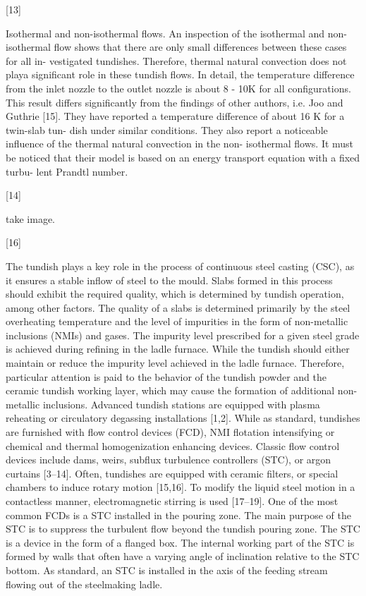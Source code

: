 [13]

Isothermal and non-isothermal flows. An inspection of
the isothermal and non-isothermal flow shows that there
are only small differences between these cases for all in-
vestigated tundishes. Therefore, thermal natural convection
does not playa significant role in these tundish flows. In
detail, the temperature difference from the inlet nozzle to
the outlet nozzle is about 8 - 10K for all configurations.
This result differs significantly from the findings of other
authors, i.e. Joo and Guthrie [15]. They have reported a
temperature difference of about 16 K for a twin-slab tun-
dish under similar conditions. They also report a noticeable
influence of the thermal natural convection in the non-
isothermal flows. It must be noticed that their model is
based on an energy transport equation with a fixed turbu-
lent Prandtl number.

[14]

take image.

[16]

The tundish plays a key role in the process of continuous steel casting (CSC), as it ensures a stable
inflow of steel to the mould. Slabs formed in this process should exhibit the required quality, which is
determined by tundish operation, among other factors. The quality of a slabs is determined primarily
by the steel overheating temperature and the level of impurities in the form of non-metallic inclusions
(NMIs) and gases. The impurity level prescribed for a given steel grade is achieved during refining in the
ladle furnace. While the tundish should either maintain or reduce the impurity level achieved in the ladle
furnace. Therefore, particular attention is paid to the behavior of the tundish powder and the ceramic
tundish working layer, which may cause the formation of additional non-metallic inclusions. Advanced
tundish stations are equipped with plasma reheating or circulatory degassing installations [1,2]. While
as standard, tundishes are furnished with flow control devices (FCD), NMI flotation intensifying or
chemical and thermal homogenization enhancing devices. Classic flow control devices include dams,
weirs, subflux turbulence controllers (STC), or argon curtains [3–14]. Often, tundishes are equipped
with ceramic filters, or special chambers to induce rotary motion [15,16]. To modify the liquid steel
motion in a contactless manner, electromagnetic stirring is used [17–19]. One of the most common
FCDs is a STC installed in the pouring zone. The main purpose of the STC is to suppress the turbulent
flow beyond the tundish pouring zone. The STC is a device in the form of a flanged box. The internal
working part of the STC is formed by walls that often have a varying angle of inclination relative to
the STC bottom. As standard, an STC is installed in the axis of the feeding stream flowing out of the
steelmaking ladle.

